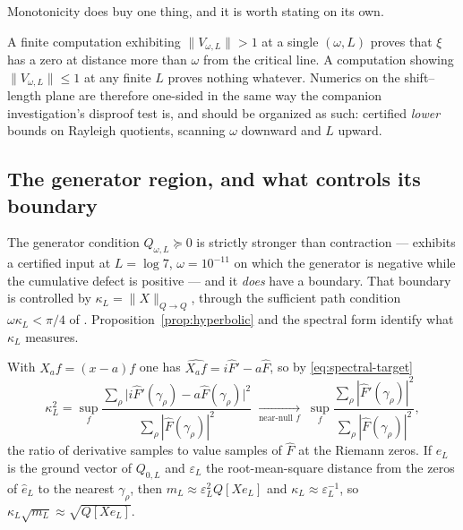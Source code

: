 Monotonicity does buy one thing, and it is worth stating on its own.

\begin{remark}\label{rem:disproof}
A finite computation exhibiting $\lVert V_{\omega,L}\rVert>1$ at a single
$(\omega,L)$ proves that $\xi$ has a zero at distance more than $\omega$ from the
critical line. A computation showing $\lVert V_{\omega,L}\rVert\leq1$ at any
finite $L$ proves nothing whatever. Numerics on the shift--length plane are
therefore one-sided in the same way the companion investigation's disproof test
is, and should be organized as such: certified \emph{lower} bounds on Rayleigh
quotients, scanning $\omega$ downward and $L$ upward.
\end{remark}

\subsection{The generator region, and what controls its boundary}

The generator condition $Q_{\omega,L}\succeq0$ is strictly stronger than
contraction --- \cite{CriticalPath} exhibits a certified input at
$L=\log7$, $\omega=10^{-11}$ on which the generator is negative while the
cumulative defect is positive --- and it \emph{does} have a boundary. That
boundary is controlled by
$\kappa_L=\lVert X\rVert_{Q\to Q}$, through the sufficient path condition
$\omega\kappa_L<\pi/4$ of \cite{CriticalPath}. Proposition~\ref{prop:hyperbolic}
and the spectral form identify what $\kappa_L$ measures.

\begin{proposition}
\label{prop:kappa}
With $X_af=(x-a)f$ one has $\widehat{X_af}=i\widehat F'-a\widehat F$, so by
\eqref{eq:spectral-target}
\[
 \kappa_L^2=\sup_f\frac{\sum_\rho\big|i\widehat F'(\gamma_\rho)
 -a\widehat F(\gamma_\rho)\big|^2}{\sum_\rho|\widehat F(\gamma_\rho)|^2}
 \;\xrightarrow[\text{near-null }f]{}\;
 \sup_f\frac{\sum_\rho|\widehat F'(\gamma_\rho)|^2}
 {\sum_\rho|\widehat F(\gamma_\rho)|^2},
\]
the ratio of derivative samples to value samples of $\widehat F$ at the Riemann
zeros. If $e_L$ is the ground vector of $Q_{0,L}$ and $\varepsilon_L$ the
root-mean-square distance from the zeros of $\widehat e_L$ to the nearest
$\gamma_\rho$, then $m_L\approx\varepsilon_L^2Q[Xe_L]$ and
$\kappa_L\approx\varepsilon_L^{-1}$, so
$\kappa_L\sqrt{m_L}\approx\sqrt{Q[Xe_L]}$.
\end{proposition}

